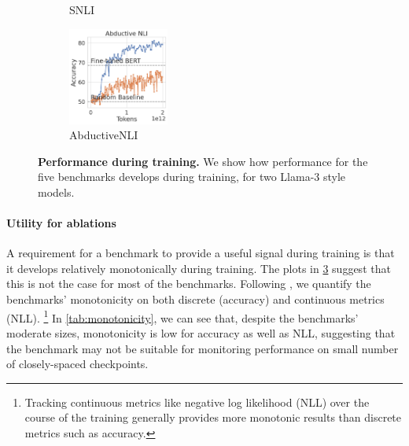 \begin{figure}[t]
\begin{subfigure}[b]{0.19\textwidth}
    \caption{SNLI}
    \label{fig:hansnli}
    \end{subfigure}
    \begin{subfigure}[b]{0.19\textwidth}
    \centering
    \includegraphics[height=3.2cm, trim=11mm 0 0 0, clip]{figures/abductivenli_intermediate}
    \caption{AbductiveNLI}
    \label{fig:mnli}
    \end{subfigure}
    \caption{\textbf{Performance during training.} We show how performance for the five benchmarks develops during training, for two Llama-3 style models.}\label{fig:performance_training}
\end{figure}

\paragraph{Utility for ablations}
A requirement for a benchmark to provide a useful signal during training is that it develops relatively monotonically during training.
The plots in \cref{fig:performance_training} suggest that this is not the case for most of the benchmarks.
Following \citet{variancepaper}, we quantify the benchmarks' monotonicity on both discrete (accuracy) and continuous metrics (NLL).%
\footnote{Tracking continuous metrics like negative log likelihood (NLL) over the course of the training generally provides more monotonic results than discrete metrics such as accuracy.}
In \cref{tab:monotonicity}, we can see that, despite the benchmarks' moderate sizes, monotonicity is low for accuracy as well as NLL, suggesting that the benchmark may not be suitable for monitoring performance on small number of closely-spaced checkpoints.

